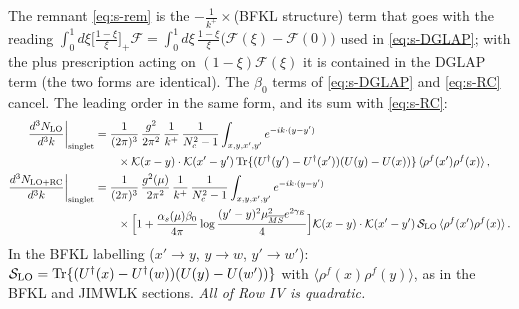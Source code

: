 \documentclass[10pt]{article}
\begin{document}
The remnant \eqref{eq:s-rem} is the $-\frac{1}{k^{+}}\times$(BFKL structure) term that goes with the reading $\int_{0}^{1}d\xi\big[\frac{1-\xi}{\xi}\big]_{+}\mathcal{F}=\int_{0}^{1}d\xi\,\frac{1-\xi}{\xi}\big(\mathcal{F}(\xi)-\mathcal{F}(0)\big)$ used in \eqref{eq:s-DGLAP}; with the plus prescription acting on $(1-\xi)\mathcal{F}(\xi)$ it is contained in the DGLAP term (the two forms are identical). The $\beta_{0}$ terms of \eqref{eq:s-DGLAP} and \eqref{eq:s-RC} cancel. The leading order in the same form, and its sum with \eqref{eq:s-RC}:
\begin{align}
\frac{d^{3}N_{\rm LO}}{d^{3}k}\bigg|_{\rm singlet}&=\frac{1}{(2\pi)^{3}}\,\frac{g^{2}}{2\pi^{2}}\,\frac{1}{k^{+}}\,\frac{1}{N_{c}^{2}-1}\int_{x,y,x',y'}e^{-ik\cdot(y-y')}\notag\\&\qquad\times\mathcal{K}(x-y)\cdot\mathcal{K}(x'-y')\,{\rm Tr}\{(U^{\dagger}(y')-U^{\dagger}(x'))(U(y)-U(x))\}\,\langle\rho^{f}(x')\rho^{f}(x)\rangle\,,\label{eq:s-LO}\\
\frac{d^{3}N_{\rm LO+RC}}{d^{3}k}\bigg|_{\rm singlet}&=\frac{1}{(2\pi)^{3}}\,\frac{g^{2}(\mu)}{2\pi^{2}}\,\frac{1}{k^{+}}\,\frac{1}{N_{c}^{2}-1}\int_{x,y,x',y'}e^{-ik\cdot(y-y')}\notag\\&\qquad\times\Big[1+\frac{\alpha_{s}(\mu)\beta_{0}}{4\pi}\log\frac{(y'-y)^{2}\mu^{2}_{\overline{MS}}e^{2\gamma_{E}}}{4}\Big]\mathcal{K}(x-y)\cdot\mathcal{K}(x'-y')\,\mathcal{S}_{\rm LO}\,\langle\rho^{f}(x')\rho^{f}(x)\rangle\,.\notag
\end{align}
In the BFKL labelling ($x'\to y$, $y\to w$, $y'\to w'$): $\mathcal{S}_{\rm LO}={\rm Tr}\{(U^{\dagger}(x)-U^{\dagger}(w))(U(y)-U(w'))\}$ with $\langle\rho^{f}(x)\rho^{f}(y)\rangle$, as in the BFKL and JIMWLK sections. \emph{All of Row IV is quadratic.}
\end{document}
